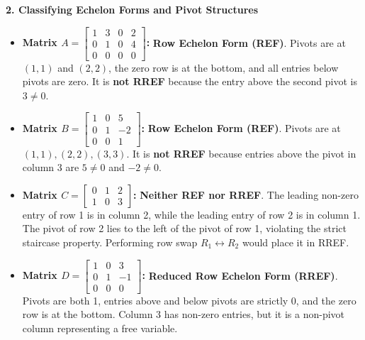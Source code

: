 \textbf{2. Classifying Echelon Forms and Pivot Structures}
\begin{itemize}
    \item \textbf{Matrix $A = \begin{bmatrix} 1 & 3 & 0 & 2 \\ 0 & 1 & 0 & 4 \\ 0 & 0 & 0 & 0 \end{bmatrix}$:}
    \textbf{Row Echelon Form (REF)}. Pivots are at $(1, 1)$ and $(2, 2)$, the zero row is at the bottom, and all entries below pivots are zero. It is \textbf{not RREF} because the entry above the second pivot is $3 \neq 0$.
    \item \textbf{Matrix $B = \begin{bmatrix} 1 & 0 & 5 \\ 0 & 1 & -2 \\ 0 & 0 & 1 \end{bmatrix}$:}
    \textbf{Row Echelon Form (REF)}. Pivots are at $(1, 1), (2, 2), (3, 3)$. It is \textbf{not RREF} because entries above the pivot in column 3 are $5 \neq 0$ and $-2 \neq 0$.
    \item \textbf{Matrix $C = \begin{bmatrix} 0 & 1 & 2 \\ 1 & 0 & 3 \end{bmatrix}$:}
    \textbf{Neither REF nor RREF}. The leading non-zero entry of row 1 is in column 2, while the leading entry of row 2 is in column 1. The pivot of row 2 lies to the left of the pivot of row 1, violating the strict staircase property. Performing row swap $R_1 \leftrightarrow R_2$ would place it in RREF.
    \item \textbf{Matrix $D = \begin{bmatrix} 1 & 0 & 3 \\ 0 & 1 & -1 \\ 0 & 0 & 0 \end{bmatrix}$:}
    \textbf{Reduced Row Echelon Form (RREF)}. Pivots are both 1, entries above and below pivots are strictly 0, and the zero row is at the bottom. Column 3 has non-zero entries, but it is a non-pivot column representing a free variable.
\end{itemize}

